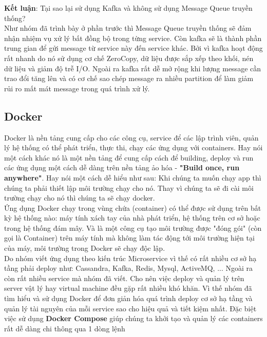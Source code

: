     
          	\textbf{Kết luận}: Tại sao lại sử dụng Kafka và không sử dụng Message Queue truyền thống? \\
            
            Như nhóm đã trình bày ở phần trước thì Message Queue truyền thống sẽ đảm nhận nhiệm vụ xử lý bất đồng bộ trong từng service. Còn kafka sẽ là thành phần trung gian để gửi message từ service này đến service khác. Bởi vì kafka hoạt động rất nhanh do nó sử dụng cơ chế ZeroCopy, dữ liệu được sắp xếp theo khối, nén dữ liệu và giảm độ trễ I/O. Ngoài ra kafka rất dễ mở rộng khi lượng message cần trao đổi tăng lên và có cơ chế sao chép message ra nhiều partition để làm giảm rủi ro mất mát message trong quá trình xử lý.
            
            \subsection{Docker}
            
            Docker\cite{docker} là nền tảng cung cấp cho các công cụ, service để các lập trình viên, quản lý hệ thống có thể phát triển, thực thi, chạy các ứng dụng với containers. Hay nói một cách khác nó là một nền tảng để cung cấp cách để building, deploy và run các ứng dụng một cách dễ dàng trên nền tảng ảo hóa - \textbf{"Build once, run anywhere"}. Hay nói một cách dễ hiểu như sau: Khi chúng ta muốn chạy app thì chúng ta phải thiết lập môi trường chạy cho nó. Thay vì chúng ta sẽ đi cài môi trường chạy cho nó thì chúng ta sẽ chạy docker.\\
            
            Ứng dụng Docker chạy trong vùng chứa (container) có thể được sử dụng trên bất kỳ hệ thống nào: máy tính xách tay của nhà phát triển, hệ thống trên cơ sở hoặc trong hệ thống đám mây. Và là một công cụ tạo môi trường được "đóng gói" (còn gọi là Container) trên máy tính mà không làm tác động tới môi trường hiện tại của máy, môi trường trong Docker sẽ chạy độc lập.\\
            
            Do nhóm viết ứng dụng theo kiến trúc Microservice vì thế có rất nhiều cơ sở hạ tầng phải deploy như: Cassandra, Kafka, Redis, Mysql, ActiveMQ, ... Ngoài ra còn rất nhiều service mà nhóm đã viết. Cho nên việc deploy và quản lý trên server vật lý hay virtual machine đều gặp rất nhiều khó khăn. Vì thế nhóm đã tìm hiểu và sử dụng Docker để đơn giản hóa quá trình deploy cơ sở hạ tầng và quản lý tài nguyên của mỗi service sao cho hiệu quả và tiết kiệm nhất. Đặc biệt việc sử dụng \textbf{Docker Compose} giúp chúng ta khởi tạo và quản lý các containers rất dễ dàng chi thông qua 1 dòng lệnh
            
